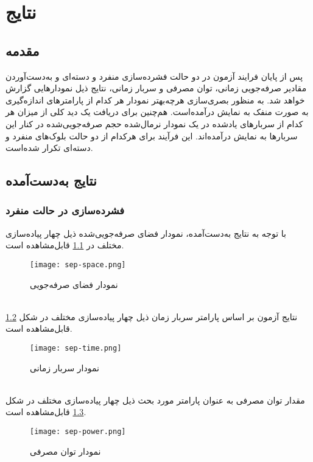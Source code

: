 \chapter{نتایج}
\section{مقدمه} 
پس از پایان فرایند آزمون در دو حالت فشرده‌سازی منفرد و دسته‌ای و به‌دست‌آوردن مقادیر صرفه‌جویی زمانی، توان مصرفی و سربار زمانی، نتایج ذیل نمودارهایی گزارش خواهد شد. به منظور بصری‌سازی هرچه‌بهتر نمودار هر کدام از پارامترهای اندازه‌گیری به صورت منفک به نمایش درآمده‌است. هم‌چنین برای دریافت یک دید کلی از میزان هر کدام از سربارهای یادشده در یک نمودار نرمال‌شده حجم صرفه‌جویی‌شده در کنار این سربارها به نمایش در‌آمده‌اند. این فرآیند برای هرکدام از دو حالت بلوک‌های منفرد و دسته‌ای تکرار شده‌است.

\section{نتایج به‌دست‌آمده}
\subsection{فشرده‌سازی در حالت منفرد}


با توجه به نتایج به‌دست‌آمده، نمودار فضای صرفه‌جویی‌شده ذیل چهار پیاده‌سازی مختلف در
\ref{fig:sep-space}
 قابل‌مشاهده است.
\begin{figure}[ht]
	\centerline{\texttt{[image: sep-space.png]}}
	\caption{نمودار فضای صرفه‌جویی}
	\label{fig:sep-space}
\end{figure}\\

نتایج آزمون بر اساس پارامتر سربار زمان ذیل چهار پیاده‌سازی مختلف در شکل
\ref{fig:sep-time}
 قابل‌مشاهده است.
\begin{figure}[ht]
	\centerline{\texttt{[image: sep-time.png]}}
	\caption{نمودار سربار زمانی}
	\label{fig:sep-time}
\end{figure}\\

مقدار توان مصرفی به عنوان پارامتر مورد بحث ذیل چهار پیاده‌سازی مختلف در شکل
\ref{fig:sep-power}
 قابل‌مشاهده است.
\begin{figure}[ht]
	\centerline{\texttt{[image: sep-power.png]}}
	\caption{نمودار توان مصرفی}
	\label{fig:sep-power}
\end{figure}\\


